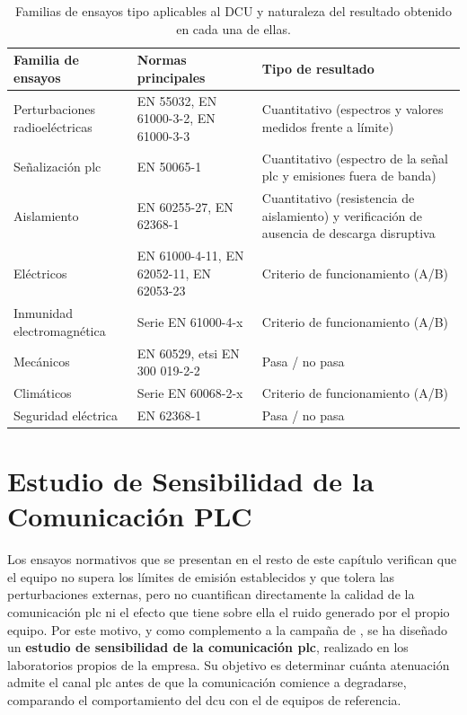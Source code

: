 \begin{table}[!h]
\centering
\small
\begin{tabular}{|p{3.4cm}|p{5.6cm}|p{5.2cm}|}
\hline
\textbf{Familia de ensayos} & \textbf{Normas principales} & \textbf{Tipo de resultado} \\ \hline
Perturbaciones radioeléctricas & EN 55032, EN 61000-3-2, EN 61000-3-3 & Cuantitativo (espectros y valores medidos frente a límite) \\ \hline
Señalización \gls{plc} & EN 50065-1 & Cuantitativo (espectro de la señal \gls{plc} y emisiones fuera de banda) \\ \hline
Aislamiento & EN 60255-27, EN 62368-1 & Cuantitativo (resistencia de aislamiento) y verificación de ausencia de descarga disruptiva \\ \hline
Eléctricos & EN 61000-4-11, EN 62052-11, EN 62053-23 & Criterio de funcionamiento (A/B) \\ \hline
Inmunidad electromagnética & Serie EN 61000-4-x & Criterio de funcionamiento (A/B) \\ \hline
Mecánicos & EN 60529, \gls{etsi} EN 300 019-2-2 & Pasa / no pasa \\ \hline
Climáticos & Serie EN 60068-2-x & Criterio de funcionamiento (A/B) \\ \hline
Seguridad eléctrica & EN 62368-1 & Pasa / no pasa \\ \hline
\end{tabular}
\caption{Familias de ensayos tipo aplicables al DCU y naturaleza del resultado obtenido en cada una de ellas.}
\label{tab:familias_ensayos}
\end{table}

\section{Estudio de Sensibilidad de la Comunicación PLC}
\label{sec:sensibilidad_plc}

Los ensayos normativos que se presentan en el resto de este capítulo verifican que el equipo no supera los límites de emisión establecidos y que tolera las perturbaciones externas, pero no cuantifican directamente la calidad de la comunicación \gls{plc} ni el efecto que tiene sobre ella el ruido generado por el propio equipo. Por este motivo, y como complemento a la campaña de , se ha diseñado un \textbf{estudio de sensibilidad de la comunicación \gls{plc}}, realizado en los laboratorios propios de la empresa. Su objetivo es determinar cuánta atenuación admite el canal \gls{plc} antes de que la comunicación comience a degradarse, comparando el comportamiento del \gls{dcu} con el de equipos de referencia.

